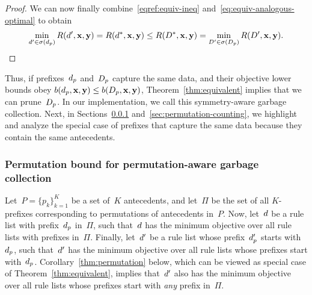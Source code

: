 \begin{arxiv}
\begin{proof}
We can now finally combine~\eqref{eqref:equiv-ineq}
and~\eqref{eq:equiv-analogous-optimal} to obtain
\begin{align}
\min_{\RL' \in \StartsWith(\Prefix)} \Obj(\RL', \x, \y)
= \Obj(\RL^*, \x, \y) \le \Obj(\RLB^*, \x, \y)
= \min_{\RLB' \in \StartsWith(\PrefixB)} \Obj(\RLB', \x, \y).
\end{align}
\end{proof}
\end{arxiv}

Thus, if prefixes~$d_p$ and~$D_p$ capture the same data,
and their objective lower bounds obey
${b(d_p, \mathbf{x}, \mathbf{y}) \le b(D_p, \mathbf{x}, \mathbf{y})}$,
Theorem~\ref{thm:equivalent} implies that we can prune~$D_p$.
%
In our implementation, we call this symmetry-aware garbage collection.
%
Next, in Sections~\ref{sec:permutation} and~\ref{sec:permutation-counting},
we highlight and analyze the special case of prefixes that capture
the same data because they contain the same antecedents.

\subsubsection{Permutation bound for permutation-aware garbage collection}
\label{sec:permutation}

Let~${P = \{p_k\}_{k=1}^K}$ be a set of~$K$ antecedents,
and let~$\Pi$ be the set of all $K$-prefixes corresponding to
permutations of antecedents in~$P$.
%
Now, let~${d}$ be a rule list with prefix~$d_p$ in~$\Pi$,
such that~${d}$ has the minimum objective over all rule lists
with prefixes in~$\Pi$.
%
Finally, let~${d}'$ be a rule list whose prefix~$d_p'$
starts with~$d_p$, such that~${d}'$ has the minimum objective
over all rule lists whose prefixes start with~$d_p$.
%
Corollary~\ref{thm:permutation} below,
which can be viewed as special case of Theorem~\ref{thm:equivalent},
implies that~${d}'$ also has the minimum objective over all
rule lists whose prefixes start with \emph{any} prefix in~$\Pi$.

